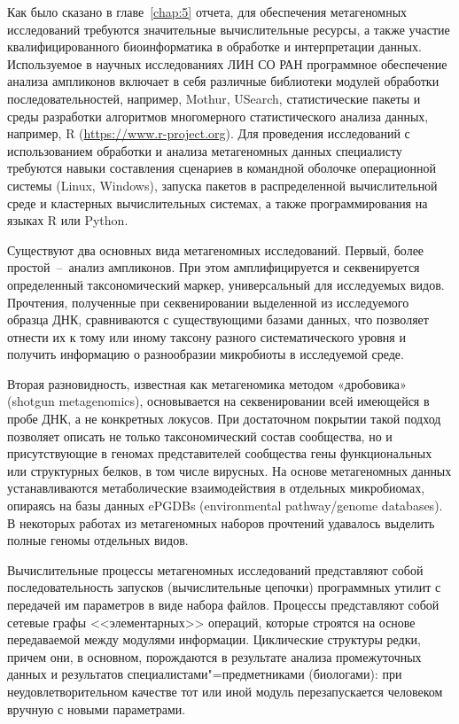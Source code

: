 \documentclass[a4paper,12pt,openany,final]{extreport}
\begin{document}
Как было сказано в главе~\ref{chap:5} отчета, для обеспечения метагеномных исследований требуются значительные вычислительные ресурсы, а также участие квалифицированного биоинформатика в обработке и интерпретации данных. Используемое в научных исследованиях ЛИН СО РАН программное обеспечение анализа ампликонов включает в себя различные библиотеки модулей обработки последовательностей, например, Mothur, USearch, статистические пакеты и среды разработки алгоритмов многомерного статистического анализа данных, например, R (\href{https://www.r"=project.org/}{{https://www.r-project.org}}). Для проведения исследований с использованием обработки и анализа метагеномных данных специалисту требуются навыки составления сценариев в командной оболочке операционной системы (Linux, Windows), запуска пакетов в распределенной вычислительной среде и кластерных вычислительных системах, а также программирования на языках R или Python.

Существуют два основных вида метагеномных исследований. Первый, более простой~--~анализ ампликонов. При этом амплифицируется и секвенируется определенный таксономический маркер, универсальный для исследуемых видов. Прочтения, полученные при секвенировании выделенной из исследуемого образца ДНК, сравниваются с существующими базами данных, что позволяет отнести их к тому или иному таксону разного систематического уровня и получить информацию о разнообразии микробиоты в исследуемой среде.

Вторая разновидность, известная как метагеномика методом «дробовика» (shotgun metagenomics), основывается на секвенировании всей имеющейся в пробе ДНК, а не конкретных локусов. При достаточном покрытии такой подход позволяет описать не только таксономический состав сообщества, но и присутствующие в геномах представителей сообщества гены функциональных или структурных белков, в том числе вирусных. На основе метагеномных данных устанавливаются метаболические взаимодействия в отдельных микробиомах, опираясь на базы данных ePGDBs (environmental pathway/genome databases). В некоторых работах из метагеномных наборов прочтений удавалось выделить полные геномы отдельных видов.

Вычислительные процессы метагеномных исследований представляют собой последовательность запусков (вычислительные цепочки) программных утилит с передачей им параметров в виде набора файлов. Процессы представляют собой сетевые графы <<элементарных>> операций, которые строятся на основе передаваемой между модулями информации. Циклические структуры редки, причем они, в основном, порождаются в результате анализа промежуточных данных и результатов специалистами"=предметниками (биологами): при неудовлетворительном качестве тот или иной модуль перезапускается человеком вручную с новыми параметрами.
\end{document}
